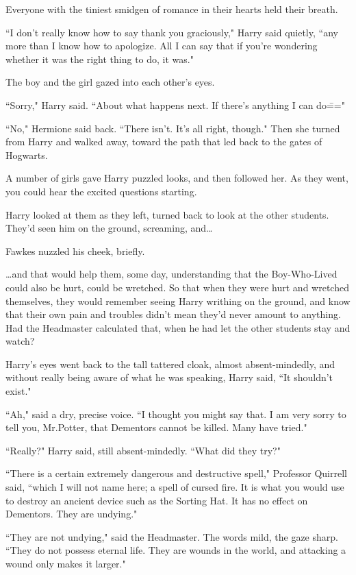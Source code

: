 Everyone with the tiniest smidgen of romance in their hearts held their breath.

``I don't really know how to say thank you graciously," Harry said quietly, ``any more than I know how to apologize. All I can say that if you're wondering whether it was the right thing to do, it was."

The boy and the girl gazed into each other's eyes.

``Sorry," Harry said. ``About what happens next. If there's anything I can do\==="

``No," Hermione said back. ``There isn't. It's all right, though." Then she turned from Harry and walked away, toward the path that led back to the gates of Hogwarts.

A number of girls gave Harry puzzled looks, and then followed her. As they went, you could hear the excited questions starting.

Harry looked at them as they left, turned back to look at the other students. They'd seen him on the ground, screaming, and{\ldots}

Fawkes nuzzled his cheek, briefly.

{\ldots}and that would help them, some day, understanding that the Boy-Who-Lived could also be hurt, could be wretched. So that when they were hurt and wretched themselves, they would remember seeing Harry writhing on the ground, and know that their own pain and troubles didn't mean they'd never amount to anything. Had the Headmaster calculated that, when he had let the other students stay and watch?

Harry's eyes went back to the tall tattered cloak, almost absent-mindedly, and without really being aware of what he was speaking, Harry said, ``It shouldn't exist."

``Ah," said a dry, precise voice. ``I thought you might say that. I am very sorry to tell you, Mr.\?Potter, that Dementors cannot be killed. Many have tried."

``Really?" Harry said, still absent-mindedly. ``What did they try?"

``There is a certain extremely dangerous and destructive spell," Professor Quirrell said, ``which I will not name here; a spell of cursed fire. It is what you would use to destroy an ancient device such as the Sorting Hat. It has no effect on Dementors. They are undying."

``They are not undying," said the Headmaster. The words mild, the gaze sharp. ``They do not possess eternal life. They are wounds in the world, and attacking a wound only makes it larger."

